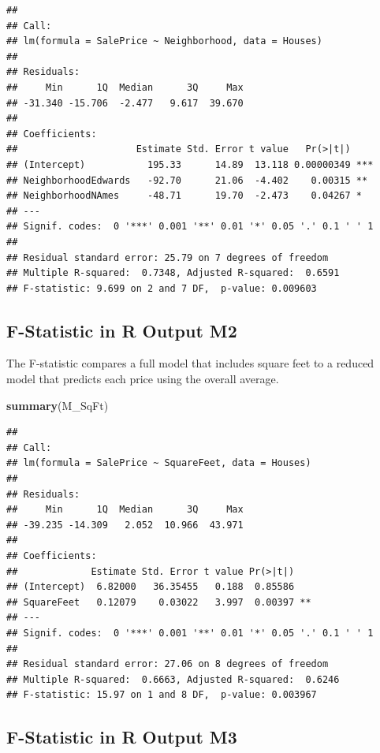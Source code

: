 \documentclass[]{book}
\newenvironment{Shaded}{\begin{snugshade}}{\end{snugshade}}
\newcommand{\KeywordTok}[1]{\textcolor[rgb]{0.13,0.29,0.53}{\textbf{#1}}}
\newcommand{\NormalTok}[1]{#1}
\begin{document}
\begin{verbatim}
## 
## Call:
## lm(formula = SalePrice ~ Neighborhood, data = Houses)
## 
## Residuals:
##     Min      1Q  Median      3Q     Max 
## -31.340 -15.706  -2.477   9.617  39.670 
## 
## Coefficients:
##                     Estimate Std. Error t value   Pr(>|t|)    
## (Intercept)           195.33      14.89  13.118 0.00000349 ***
## NeighborhoodEdwards   -92.70      21.06  -4.402    0.00315 ** 
## NeighborhoodNAmes     -48.71      19.70  -2.473    0.04267 *  
## ---
## Signif. codes:  0 '***' 0.001 '**' 0.01 '*' 0.05 '.' 0.1 ' ' 1
## 
## Residual standard error: 25.79 on 7 degrees of freedom
## Multiple R-squared:  0.7348, Adjusted R-squared:  0.6591 
## F-statistic: 9.699 on 2 and 7 DF,  p-value: 0.009603
\end{verbatim}

\subsection{F-Statistic in R Output
M2}\label{f-statistic-in-r-output-m2}

The F-statistic compares a full model that includes square feet to a
reduced model that predicts each price using the overall average.

\begin{Shaded}
\begin{Highlighting}[]
\KeywordTok{summary}\NormalTok{(M_SqFt)}
\end{Highlighting}
\end{Shaded}

\begin{verbatim}
## 
## Call:
## lm(formula = SalePrice ~ SquareFeet, data = Houses)
## 
## Residuals:
##     Min      1Q  Median      3Q     Max 
## -39.235 -14.309   2.052  10.966  43.971 
## 
## Coefficients:
##             Estimate Std. Error t value Pr(>|t|)   
## (Intercept)  6.82000   36.35455   0.188  0.85586   
## SquareFeet   0.12079    0.03022   3.997  0.00397 **
## ---
## Signif. codes:  0 '***' 0.001 '**' 0.01 '*' 0.05 '.' 0.1 ' ' 1
## 
## Residual standard error: 27.06 on 8 degrees of freedom
## Multiple R-squared:  0.6663, Adjusted R-squared:  0.6246 
## F-statistic: 15.97 on 1 and 8 DF,  p-value: 0.003967
\end{verbatim}

\subsection{F-Statistic in R Output
M3}\label{f-statistic-in-r-output-m3}
\end{document}
